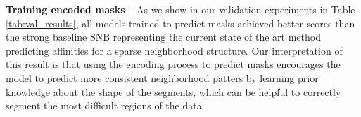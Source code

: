 \textbf{Training encoded masks} -- As we show in our validation experiments in Table \ref{tab:val_results}, all models trained to predict \maskname masks achieved better scores than the strong baseline SNB representing the current state of the art method predicting affinities for a sparse neighborhood structure. 
Our interpretation of this result is that using the encoding process to predict \maskname masks encourages the model to predict more consistent neighborhood patters by learning prior knowledge about the shape of the segments, which can be helpful to correctly segment the most difficult regions of the data. \\

